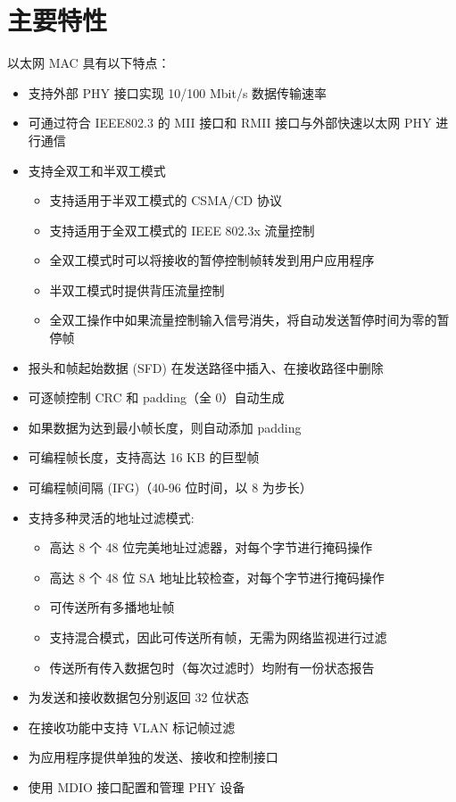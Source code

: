 \documentclass[main\_\_CN.tex]{subfiles}
\begin{document}
\section{主要特性}
\chipname{} 以太网 MAC 具有以下特点：
\begin{itemize}
	\item 支持外部 PHY 接口实现 10/100 Mbit/s 数据传输速率
	\item 可通过符合 IEEE802.3 的 MII 接口和 RMII 接口与外部快速以太网 PHY 进行通信
	\item 支持全双工和半双工模式
        \begin{itemize}
    	\item 支持适用于半双工模式的 CSMA/CD 协议
		\item 支持适用于全双工模式的 IEEE 802.3x 流量控制
		\item 全双工模式时可以将接收的暂停控制帧转发到用户应用程序
		\item 半双工模式时提供背压流量控制
		\item 全双工操作中如果流量控制输入信号消失，将自动发送暂停时间为零的暂停帧
	\end{itemize}
	\item 报头和帧起始数据 (SFD) 在发送路径中插入、在接收路径中删除
	\item 可逐帧控制 CRC 和 padding（全 0）自动生成
	\item 如果数据为达到最小帧长度，则自动添加 padding
	\item 可编程帧长度，支持高达 16 KB 的巨型帧
	\item 可编程帧间隔 (IFG)（40-96 位时间，以 8 为步长）
	\item 支持多种灵活的地址过滤模式:
		 \begin{itemize}
    	\item 高达 8 个 48 位完美地址过滤器，对每个字节进行掩码操作
		\item 高达 8 个 48 位 SA 地址比较检查，对每个字节进行掩码操作
		\item 可传送所有多播地址帧
		\item 支持混合模式，因此可传送所有帧，无需为网络监视进行过滤
		\item 传送所有传入数据包时（每次过滤时）均附有一份状态报告
        \end{itemize}
	\item 为发送和接收数据包分别返回 32 位状态
        \item 在接收功能中支持 VLAN 标记帧过滤
	\item 为应用程序提供单独的发送、接收和控制接口
	\item 使用 MDIO 接口配置和管理 PHY 设备

\end{itemize}
\end{document}
